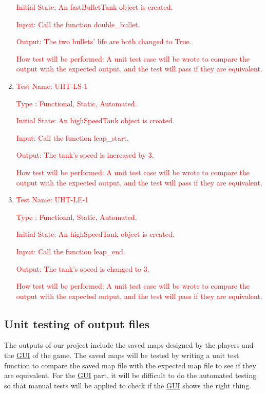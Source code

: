 \documentclass[12pt, titlepage]{article}
\begin{document}
\begin{enumerate}
\textcolor{red}{Initial State: An fastBulletTank object is created.}

\textcolor{red}{Input: Call the function double\_bullet.}

\textcolor{red}{Output: The two bullets' life are both changed to True.}

\textcolor{red}{How test will be performed: A unit test case will be wrote to compare the output with the expected output, and the test will pass if they are equivalent.}\\

\item{\textcolor{red}{Test Name: UHT-LS-1}}

\textcolor{red}{Type : Functional, Static, Automated.}

\textcolor{red}{Initial State: An highSpeedTank object is created.}

\textcolor{red}{Input: Call the function leap\_start.}

\textcolor{red}{Output: The tank's speed is increased by 3.}

\textcolor{red}{How test will be performed: A unit test case will be wrote to compare the output with the expected output, and the test will pass if they are equivalent.}\\

\item{\textcolor{red}{Test Name: UHT-LE-1}}

\textcolor{red}{Type : Functional, Static, Automated.}

\textcolor{red}{Initial State: An highSpeedTank object is created.}

\textcolor{red}{Input: Call the function leap\_end.}

\textcolor{red}{Output: The tank's speed is changed to 3.}

\textcolor{red}{How test will be performed: A unit test case will be wrote to compare the output with the expected output, and the test will pass if they are equivalent.}\\
\end{enumerate}

\subsection{Unit testing of output files}		
The outputs of our project include the saved maps designed by the players and the \underline{GUI} of the game. The saved maps will be tested by writing a unit test function to compare the saved map file with the expected map file to see if they are equivalent. For the \underline{GUI} part, it will be difficult to do the automated testing so that manual tests will be applied to check if the \underline{GUI} shows the right thing.

\end{document}
